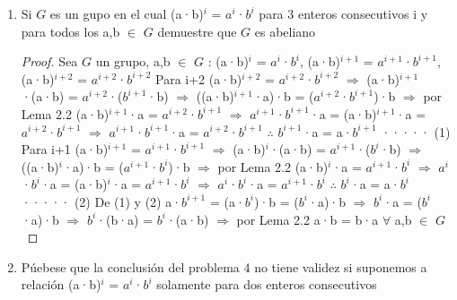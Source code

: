\documentclass[10pt,a4paper,oneside]{article}
\begin{document}
\begin{enumerate}[1.]
\begin{proof}
					\end{proof}
					\item Si $G$ es un gupo en el cual (a·b)$^i$ = $a^i$·$b^i$ para 3 enteros consecutivos i y para todos los a,b $\in$ $G$ demuestre que $G$ es abeliano
					\begin{proof}
						Sea $G$ un grupo, a,b $\in$ $G$ : (a·b)$^{i}$ = $a^i$·$b^i$, (a·b)$^{i+1}$ = $a^{i+1}$·$b^{i+1}$, (a·b)$^{i+2}$ = $a^{i+2}$·$b^{i+2}$ 
						\newline
						Para i+2
						\newline
						(a·b)$^{i+2}$ = $a^{i+2}$·$b^{i+2}$ $\Rightarrow$ (a·b)$^{i+1}$·(a·b) = $a^{i+2}$·($b^{i+1}$·b) $\Rightarrow$ ((a·b)$^{i+1}$·a)·b = ($a^{i+2}$·$b^{i+1}$)·b $\Rightarrow$ por Lema 2.2 (a·b)$^{i+1}$·a = $a^{i+2}$·$b^{i+1}$ $\Rightarrow$ $a^{i+1}$·$b^{i+1}$·a = (a·b)$^{i+1}$·a = $a^{i+2}$·$b^{i+1}$ $\Rightarrow$ $a^{i+1}$·$b^{i+1}$·a = $a^{i+2}$·$b^{i+1}$ $\therefore$ $b^{i+1}$·a = a·$b^{i+1}$ ····· (1)
						\newline
						Para i+1
						\newline(a·b)$^{i+1}$ = $a^{i+1}$·$b^{i+1}$ $\Rightarrow$ (a·b)$^{i}$·(a·b) = $a^{i+1}$·($b^{i}$·b) $\Rightarrow$ ((a·b)$^{i}$·a)·b = ($a^{i+1}$·$b^{i}$)·b $\Rightarrow$ por Lema 2.2 (a·b)$^{i}$·a = $a^{i+1}$·$b^{i}$ $\Rightarrow$ $a^{i}$·$b^{i}$·a = (a·b)$^{i}$·a = $a^{i+1}$·$b^{i}$ $\Rightarrow$ $a^{i}$·$b^{i}$·a = $a^{i+1}$·$b^{i}$ $\therefore$ $b^{i}$·a = a·$b^{i}$ ····· (2)
						\newline
						De (1) y (2)
						a·$b^{i+1}$ = (a·$b^i$)·b = ($b^{i}$·a)·b $\Rightarrow$ $b^{i}$·a  = ($b^{i}$·a)·b $\Rightarrow$ $b^i$·(b·a) = $b^i$·(a·b) $\Rightarrow$ por Lema 2.2 a·b = b·a $\forall$ a,b $\in$ $G$
					\end{proof}
					\item Púebese que la conclusión del problema 4 no tiene validez si suponemos a relación (a·b)$^i$ = $a^i$·$b^i$ solamente para dos enteros consecutivos 
				\end{enumerate}
\end{document}
